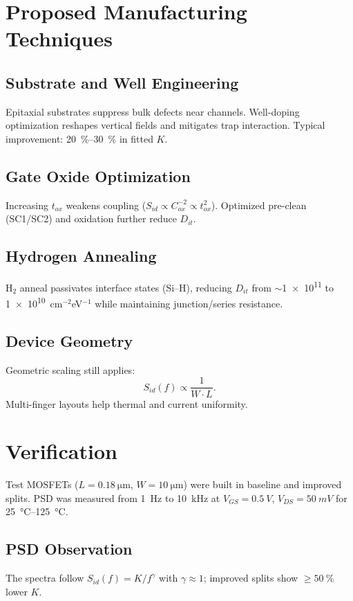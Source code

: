 \documentclass[conference]{IEEEtran}
\begin{document}
\section{Proposed Manufacturing Techniques}
\subsection{Substrate and Well Engineering}
Epitaxial substrates suppress bulk defects near channels. Well-doping optimization reshapes vertical fields and mitigates trap interaction. Typical improvement: \SI{20}{\percent}--\SI{30}{\percent} in fitted $K$.

\subsection{Gate Oxide Optimization}
Increasing $t_{ox}$ weakens coupling ($S_{id}\!\propto\! C_{ox}^{-2}\!\propto\! t_{ox}^{2}$). Optimized pre-clean (SC1/SC2) and oxidation further reduce $D_{it}$.

\subsection{Hydrogen Annealing}
H$_2$ anneal passivates interface states (Si--H), reducing $D_{it}$ from $\sim$\num{1e11} to \num{1e10}~cm$^{-2}$eV$^{-1}$ while maintaining junction/series resistance.

\subsection{Device Geometry}
Geometric scaling still applies:
\begin{equation}
  S_{id}(f) \propto \frac{1}{W\cdot L}.
\end{equation}
Multi-finger layouts help thermal and current uniformity.

\section{Verification}
Test MOSFETs ($L=\SI{0.18}{\micro\meter}$, $W=\SI{10}{\micro\meter}$) were built in baseline and improved splits. PSD was measured from \SI{1}{\hertz} to \SI{10}{\kilo\hertz} at $V_{GS}=\SI{0.5}{V}$, $V_{DS}=\SI{50}{mV}$ for \SIrange{25}{125}{\celsius}.

\subsection{PSD Observation}
The spectra follow $S_{id}(f)=K/f^{\gamma}$ with $\gamma\approx 1$; improved splits show $\geq\SI{50}{\percent}$ lower $K$.
\end{document}
